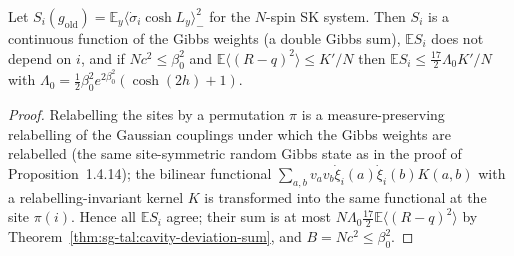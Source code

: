 \begin{lemma}
\label{lem:sg-tal:cavity-site-symmetry}
  \leanok
{}
Let $S_i(g_{\mathrm{old}})=\mathbb E_y\langle\dot\sigma_i\cosh L_y\rangle_-^2$ for the $N$-spin SK system.  Then $S_i$ is a continuous function of the Gibbs weights (a double Gibbs sum), $\mathbb E S_i$ does not depend on $i$, and if $Nc^2\le\beta_0^2$ and $\mathbb E\langle(R-q)^2\rangle\le K'/N$ then $\mathbb E S_i\le\frac{17}2\Lambda_0K'/N$ with $\Lambda_0=\frac12\beta_0^2e^{2\beta_0^2}(\cosh(2h)+1)$.
\end{lemma}
\begin{proof}
  \leanok
Relabelling the sites by a permutation $\pi$ is a measure-preserving relabelling of the Gaussian couplings under which the Gibbs weights are relabelled (the same site-symmetric random Gibbs state as in the proof of Proposition~1.4.14); the bilinear functional $\sum_{a,b}v_av_b\dot\xi_i(a)\dot\xi_i(b)K(a,b)$ with a relabelling-invariant kernel $K$ is transformed into the same functional at the site $\pi(i)$.  Hence all $\mathbb E S_i$ agree; their sum is at most $N\Lambda_0\frac{17}2\mathbb E\langle(R-q)^2\rangle$ by Theorem~\ref{thm:sg-tal:cavity-deviation-sum}, and $B=Nc^2\le\beta_0^2$.
\end{proof}

